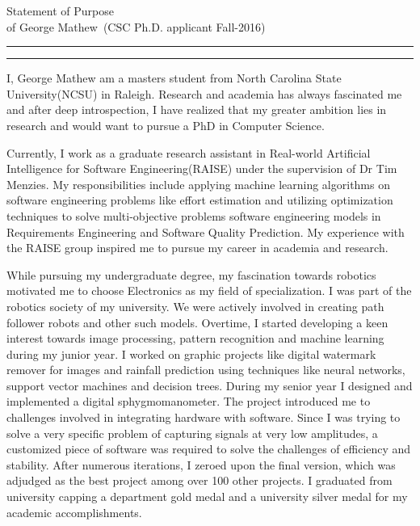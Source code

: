 \documentclass{article}
\newcommand{\soptitle}{Statement of Purpose}
\newcommand{\yourname}{George Mathew}
\begin{document}
\begin{center}\LARGE\soptitle\\
\large of \yourname\ (CSC Ph.D. applicant Fall-2016)
\end{center}

\hrule
\vspace{1pt}
\hrule height 1pt

\bigskip

I, George Mathew am a masters student from North Carolina State University(NCSU) in Raleigh. Research and academia has always fascinated me and after deep introspection, I have realized that my greater ambition lies in research and would want to pursue a PhD in Computer Science.

\bigskip
Currently, I work as a graduate research assistant in Real-world Artificial Intelligence for 
Software Engineering(RAISE) under the supervision of Dr Tim Menzies.
 My responsibilities include applying machine learning algorithms on software engineering 
 problems like effort estimation and utilizing optimization techniques to solve multi-objective problems software engineering models in Requirements Engineering and Software Quality Prediction. My experience with the RAISE group inspired me to pursue my career in academia and research. 

\bigskip

While pursuing my undergraduate degree, my fascination towards robotics motivated me to choose Electronics as my field of specialization. I was part of the robotics society of my university. We were actively involved in creating path follower robots and other such models. Overtime, I started developing a keen interest towards image 
processing, pattern recognition and machine learning during my junior year. I worked on 
graphic projects like digital watermark remover for images and rainfall prediction using techniques like neural 
networks, support vector machines and decision trees. During my senior year I designed and implemented a digital sphygmomanometer. The project introduced me to challenges involved in integrating hardware with software. Since I was trying to solve a very specific problem of capturing signals at very low amplitudes, a customized piece of software was required to solve the challenges of efficiency and stability. After numerous iterations, I zeroed upon the final version, which was adjudged as the best project among over 100 other projects. I graduated from university capping a department gold medal and a university silver medal for my academic accomplishments.
\end{document}
